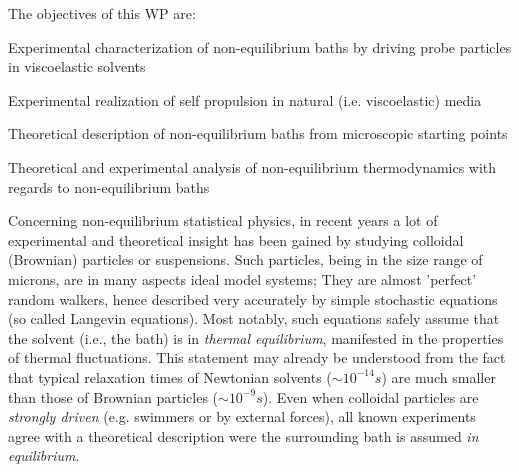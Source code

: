\begin{workpackage}[id=WPbrown,wphases=0-48,
  short=Brown. particles, %
  title=Brownian particles in nonequilibrium baths, %
  lead=USTUTT,
  USTUTTRM=72,KULRM=6,LeipzigRM=6,PadovaRM=6]

\begin{wpobjectives}
The objectives of this WP are:
\begin{compactitem}
\item Experimental characterization of non-equilibrium baths by driving probe particles in viscoelastic solvents
\item Experimental realization of self propulsion in natural (i.e. viscoelastic) media
\item Theoretical description of non-equilibrium baths from microscopic starting points
\item Theoretical and experimental analysis of non-equilibrium thermodynamics with regards to non-equilibrium baths
  \end{compactitem}
\end{wpobjectives}

\begin{wpdescription}

Concerning non-equilibrium statistical physics, in recent years a lot of experimental and
theoretical insight has been gained by studying colloidal (Brownian) particles or
suspensions. Such particles, being in the size range of microns, are in many aspects ideal
model systems; They are almost 'perfect' random walkers, hence described very accurately by
simple stochastic equations (so called Langevin equations). Most notably, such equations
safely assume that the solvent (i.e., the bath) is in {\it thermal equilibrium}, manifested
in the properties of thermal fluctuations. This statement may already be understood from the
fact that typical relaxation times of Newtonian solvents ($\sim 10^{-14} s$) are much
smaller than those of Brownian particles ($\sim 10^{-9} s$). Even when colloidal particles
are {\it strongly driven} (e.g. swimmers or by external forces), all known experiments agree
with a theoretical description were the surrounding bath is assumed {\it in equilibrium}.


\end{wpdescription}
\end{workpackage}
